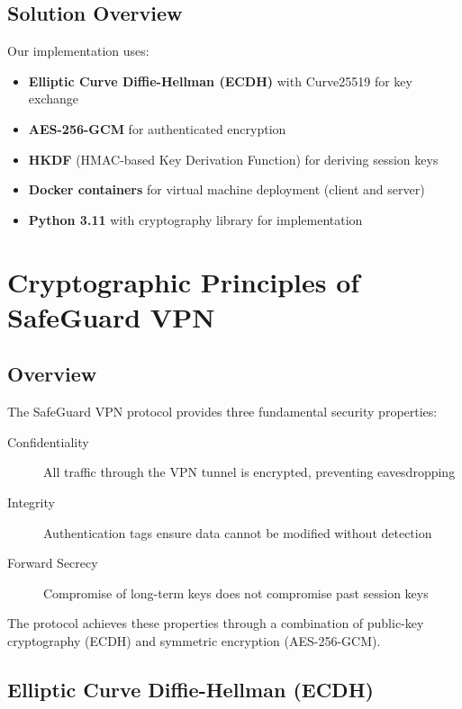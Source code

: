 \documentclass[12pt,a4paper]{article}
\begin{document}
\subsection{Solution Overview}

Our implementation uses:

\begin{itemize}
    \item \textbf{Elliptic Curve Diffie-Hellman (ECDH)} with Curve25519 for key exchange
    \item \textbf{AES-256-GCM} for authenticated encryption
    \item \textbf{HKDF} (HMAC-based Key Derivation Function) for deriving session keys
    \item \textbf{Docker containers} for virtual machine deployment (client and server)
    \item \textbf{Python 3.11} with cryptography library for implementation
\end{itemize}

\section{Cryptographic Principles of SafeGuard VPN}

\subsection{Overview}

The SafeGuard VPN protocol provides three fundamental security properties:

\begin{description}
    \item[Confidentiality] All traffic through the VPN tunnel is encrypted, preventing eavesdropping
    \item[Integrity] Authentication tags ensure data cannot be modified without detection
    \item[Forward Secrecy] Compromise of long-term keys does not compromise past session keys
\end{description}

The protocol achieves these properties through a combination of public-key cryptography (ECDH) and symmetric encryption (AES-256-GCM).

\subsection{Elliptic Curve Diffie-Hellman (ECDH)}
\end{document}
